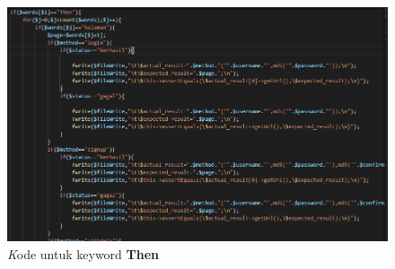 \documentclass[a4paper,twoside]{article}
\begin{document}
\begin{enumerate}
\begin{figure}[h!]
			\includegraphics[scale=0.70]{../DokumenSkripsi/gambar/implementasi10}
			\centering
			\caption{\textit Kode untuk keyword \textbf{Then}}
		\end{figure}


\end{enumerate}
\end{document}
